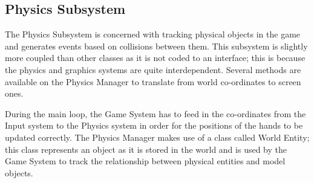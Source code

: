 \subsection{Physics Subsystem}
The Physics Subsystem is concerned with tracking physical objects in the game
and generates events based on collisions between them. This subsystem is 
slightly more coupled than other classes as it is not coded to an interface; 
this is because the physics and graphics systems are quite interdependent. 
Several methods are available on the Physics Manager to translate from world 
co-ordinates to screen ones. 

During the main loop, the Game System has to feed in the co-ordinates from the
Input system to the Physics system in order for the positions of the hands to 
be updated correctly. The Physics Manager makes use of a class called World
Entity; this class represents an object as it is stored in the world and is 
used by the Game System to track the relationship between physical entities and
model objects.

